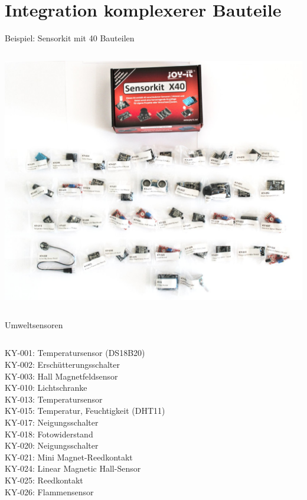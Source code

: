 \section{Integration komplexerer Bauteile}

{
\tiny

\begin{frame}[allowframebreaks]{Beispiel: Sensorkit mit 40 Bauteilen}
    \begin{columns}
        \column{\dimexpr\paperwidth-28pt}
        \begin{center}
            \includegraphics[height=.8\textheight]{2-hardwaredesign/img/sensorkit_alle}
        \end{center}
    \end{columns}

    \begin{block}{Umweltsensoren}
        \medskip
        \begin{columns}
            KY-001: Temperatursensor (DS18B20) \\
            KY-002: Erschütterungsschalter \\
            KY-003: Hall Magnetfeldsensor \\
            KY-010: Lichtschranke \\
            KY-013: Temperatursensor \\
            KY-015: Temperatur, Feuchtigkeit (DHT11) \\
            KY-017: Neigungsschalter \\
            KY-018: Fotowiderstand \\
            KY-020: Neigungsschalter \\
            KY-021: Mini Magnet-Reedkontakt \\
            KY-024: Linear Magnetic Hall-Sensor \\
            KY-025: Reedkontakt \\
            KY-026: Flammensensor \\


\end{columns}
\end{block}
\end{frame}}
